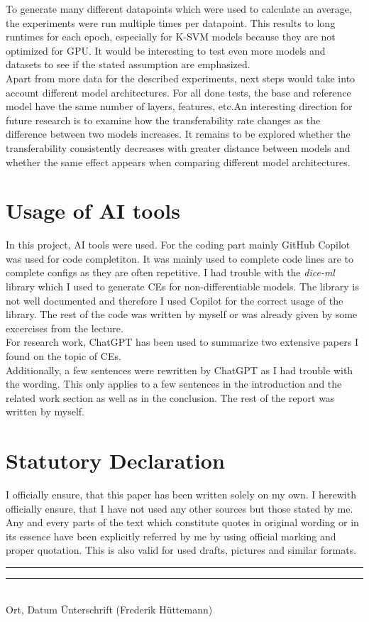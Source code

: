 \documentclass{article}
\begin{document}
To generate many different datapoints which were used to calculate an average, the experiments were run multiple times per datapoint. This results to long runtimes for each epoch, especially for K-SVM models because they are not optimized for GPU. It would be interesting to test even more models and datasets to see if the stated assumption are emphasized.\\
Apart from more data for the described experiments, next steps would take into account different model architectures. For all done tests, the base and reference model have the same number of layers, features, etc.An interesting direction for future research is to examine how the transferability rate changes as the difference between two models increases. It remains to be explored whether the transferability consistently decreases with greater distance between models and whether the same effect appears when comparing different model architectures.\\ 
\newpage




\newpage
\appendix

\section{Usage of AI tools}
In this project, AI tools were used. For the coding part mainly GitHub Copilot was used for code completiton. It was mainly used to complete code lines are to complete configs as they are often repetitive. I had trouble with the \textit{dice-ml} library which I used to generate CEs for non-differentiable models. The library is not well documented and therefore I used Copilot for the correct usage of the library. The rest of the code was written by myself or was already given by some excercises from the lecture.\\
For research work, ChatGPT has been used to summarize two extensive papers I found on the topic of CEs.\\
Additionally, a few sentences were rewritten by ChatGPT as I had trouble with the wording. This only applies to a few sentences in the introduction and the related work section as well as in the conclusion. The rest of the report was written by myself.\\

\section{Statutory Declaration}
I officially ensure, that this paper has been written solely on my own. I herewith officially ensure, that I have not used any other sources but those stated by me. Any and every parts of the text which constitute quotes in original wording or in its essence have been explicitly referred by me by using official marking and proper quotation. This is also valid for used drafts, pictures and similar formats.\\
\vspace{3cm}

\begin{tabbing}
\rule{5cm}{0.4pt} \hspace{3cm} \rule{6cm}{0.4pt}\\
Ort, Datum \hspace{6.4cm} \= Unterschrift (Frederik Hüttemann)\\
\end{tabbing}
\end{document}
